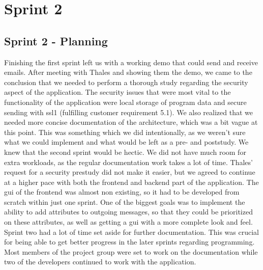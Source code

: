 \chapter{Sprint 2}

\section{Sprint 2 - Planning}
Finishing the first sprint left us with a working demo that could send and receive emails. After meeting with Thales and showing them the demo, we came to the conclusion that we needed to perform a thorough study regarding the security aspect of the application. The security issues that were most vital to the functionality of the application were local storage of program data and secure sending with \gls{ssl1} (fulfilling customer requirement 5.1). We also realized that we needed more concise documentation of the architecture, which was a bit vague at this point. This was something which we did intentionally, as we weren’t sure what we could implement and what would be left as a pre- and poststudy. 
\newline
\newline
We knew that the second sprint would be hectic. We did not have much room for extra workloads, as the regular documentation work takes a lot of time. Thales' request for a security prestudy did not make it easier, but we agreed to continue at a higher pace with both the frontend and backend part of the application. The \gls{gui} of the frontend was almost non existing, so it had to be developed from scratch within just one sprint. One of the biggest goals was to implement the ability to add attributes to outgoing messages, so that they could be prioritized on these attributes, as well as getting a \gls{gui} with a more complete look and feel.
\newline
\newline
Sprint two had a lot of time set aside for further documentation. This was crucial for being able to get better progress in the later sprints regarding programming. Most members of the project group were set to work on the documentation while two of the developers continued to work with the application. 